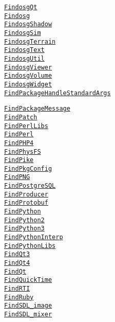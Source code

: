\documentclass{article}
\newcommand{\cmakemodule}[1]{{\href{https://cmake.org/cmake/help/v3.20/module/#1.html}{{\lstinline{#1}}}}}
\begin{document}
\begin{minipage}[t]{0.18\linewidth}
\cmakemodule{FindosgQt}\\
\cmakemodule{Findosg}\\
\cmakemodule{FindosgShadow}\\
\cmakemodule{FindosgSim}\\
\cmakemodule{FindosgTerrain}\\
\cmakemodule{FindosgText}\\
\cmakemodule{FindosgUtil}\\
\cmakemodule{FindosgViewer}\\
\cmakemodule{FindosgVolume}\\
\cmakemodule{FindosgWidget}\\
\cmakemodule{FindPackageHandleStandardArgs}\\
\end{minipage}
\hfill\vline\hfill
\begin{minipage}[t]{0.18\linewidth}
\cmakemodule{FindPackageMessage}\\
\cmakemodule{FindPatch}\\
\cmakemodule{FindPerlLibs}\\
\cmakemodule{FindPerl}\\
\cmakemodule{FindPHP4}\\
\cmakemodule{FindPhysFS}\\
\cmakemodule{FindPike}\\
\cmakemodule{FindPkgConfig}\\
\cmakemodule{FindPNG}\\
\cmakemodule{FindPostgreSQL}\\
\cmakemodule{FindProducer}\\
\cmakemodule{FindProtobuf}\\
\cmakemodule{FindPython}\\
\cmakemodule{FindPython2}\\
\cmakemodule{FindPython3}\\
\cmakemodule{FindPythonInterp}\\
\cmakemodule{FindPythonLibs}\\
\cmakemodule{FindQt3}\\
\cmakemodule{FindQt4}\\
\cmakemodule{FindQt}\\
\cmakemodule{FindQuickTime}\\
\cmakemodule{FindRTI}\\
\cmakemodule{FindRuby}\\
\cmakemodule{FindSDL_image}\\
\cmakemodule{FindSDL_mixer}\\

\end{minipage}
\end{document}
